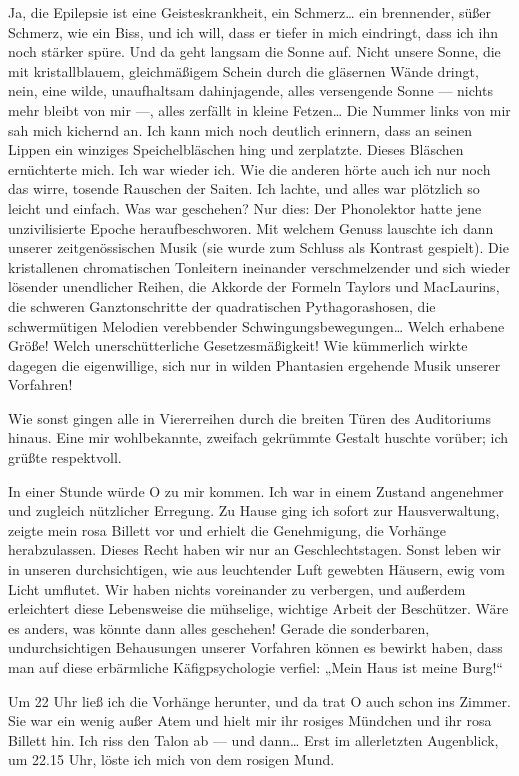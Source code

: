Ja, die Epilepsie ist eine Geisteskrankheit, ein Schmerz\ldots{} ein
brennender, süßer Schmerz, wie ein Biss, und ich will, dass er
tiefer in mich eindringt, dass ich ihn noch stärker spüre. Und da
geht langsam die Sonne auf. Nicht unsere Sonne, die mit
kristallblauem, gleichmäßigem Schein durch die gläsernen Wände
dringt, nein, eine wilde, unaufhaltsam dahinjagende, alles
versengende Sonne — nichts mehr bleibt von mir —, alles zerfällt in
kleine Fetzen\ldots{} Die Nummer links von mir sah mich kichernd an. Ich
kann mich noch deutlich erinnern, dass an seinen Lippen ein
winziges Speichelbläschen hing und zerplatzte. Dieses Bläschen
ernüchterte mich. Ich war wieder ich. Wie die anderen hörte auch
ich nur noch das wirre, tosende Rauschen der Saiten. Ich lachte,
und alles war plötzlich so leicht und einfach. Was war geschehen?
Nur dies: Der Phonolektor hatte jene unzivilisierte Epoche
heraufbeschworen. Mit welchem Genuss lauschte ich dann unserer
zeitgenössischen Musik (sie wurde zum Schluss als Kontrast
gespielt). Die kristallenen chromatischen Tonleitern ineinander
verschmelzender und sich wieder lösender unendlicher Reihen, die
Akkorde der Formeln Taylors und MacLaurins, die schweren
Ganztonschritte der quadratischen Pythagorashosen, die
schwermütigen Melodien verebbender Schwingungsbewegungen\ldots{} Welch
erhabene Größe! Welch unerschütterliche Gesetzesmäßigkeit! Wie
kümmerlich wirkte dagegen die eigenwillige, sich nur in wilden
Phantasien ergehende Musik unserer Vorfahren!

Wie sonst gingen alle in Viererreihen durch die breiten Türen des
Auditoriums hinaus. Eine mir wohlbekannte, zweifach gekrümmte
Gestalt huschte vorüber; ich grüßte respektvoll.

In einer Stunde würde O zu mir kommen. Ich war in einem Zustand
angenehmer und zugleich nützlicher Erregung. Zu Hause ging ich
sofort zur Hausverwaltung, zeigte mein rosa Billett vor und erhielt
die Genehmigung, die Vorhänge herabzulassen. Dieses Recht haben wir
nur an Geschlechtstagen. Sonst leben wir in unseren durchsichtigen,
wie aus leuchtender Luft gewebten Häusern, ewig vom Licht umflutet.
Wir haben nichts voreinander zu verbergen, und außerdem erleichtert
diese Lebensweise die mühselige, wichtige Arbeit der Beschützer.
Wäre es anders, was könnte dann alles geschehen! Gerade die
sonderbaren, undurchsichtigen Behausungen unserer Vorfahren können
es bewirkt haben, dass man auf diese erbärmliche Käfigpsychologie
verfiel: „Mein Haus ist meine Burg!“

Um 22 Uhr ließ ich die Vorhänge herunter, und da trat O auch schon
ins Zimmer. Sie war ein wenig außer Atem und hielt mir ihr rosiges
Mündchen und ihr rosa Billett hin. Ich riss den Talon ab — und
dann\ldots{} Erst im allerletzten Augenblick, um 22.15 Uhr, löste ich
mich von dem rosigen Mund.

